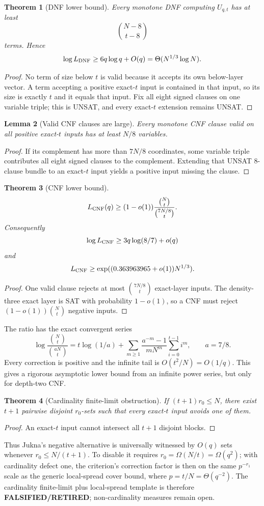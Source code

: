 \documentclass[11pt]{article}
\newtheorem{theorem}{Theorem}
\newtheorem{lemma}[theorem]{Lemma}
\begin{document}
\begin{theorem}[DNF lower bound]
Every monotone DNF computing $U_{q,t}$ has at least
\[
\binom{N-8}{t-8}
\]
terms. Hence
\[
\log L_{\rm DNF}\ge6q\log q+O(q)=\Theta(N^{1/3}\log N).
\]
\end{theorem}
\begin{proof}
No term of size below $t$ is valid because it accepts its own below-layer vector. A term accepting a positive exact-$t$ input is contained in that input, so its size is exactly $t$ and it equals that input. Fix all eight signed clauses on one variable triple; this is UNSAT, and every exact-$t$ extension remains UNSAT.
\end{proof}

\begin{lemma}[Valid CNF clauses are large]
Every monotone CNF clause valid on all positive exact-$t$ inputs has at least $N/8$ variables.
\end{lemma}
\begin{proof}
If its complement has more than $7N/8$ coordinates, some variable triple contributes all eight signed clauses to the complement. Extending that UNSAT 8-clause bundle to an exact-$t$ input yields a positive input missing the clause.
\end{proof}

\begin{theorem}[CNF lower bound]
\[
L_{\rm CNF}(q)\ge(1-o(1))\frac{\binom Nt}{\binom{7N/8}{t}}.
\]
Consequently
\[
\log L_{\rm CNF}\ge3q\log(8/7)+o(q)
\]
and
\[
L_{\rm CNF}\ge\exp((0.363963965+o(1))N^{1/3}).
\]
\end{theorem}
\begin{proof}
One valid clause rejects at most $\binom{7N/8}{t}$ exact-layer inputs. The density-three exact layer is SAT with probability $1-o(1)$, so a CNF must reject $(1-o(1))\binom Nt$ negative inputs.
\end{proof}

The ratio has the exact convergent series
\[
\log\frac{\binom Nt}{\binom{aN}{t}}
=t\log(1/a)+\sum_{m\ge1}\frac{a^{-m}-1}{mN^m}\sum_{i=0}^{t-1}i^m,
\qquad a=7/8.
\]
Every correction is positive and the infinite tail is $O(t^2/N)=O(1/q)$. This gives a rigorous asymptotic lower bound from an infinite power series, but only for depth-two CNF.

\begin{theorem}[Cardinality finite-limit obstruction]
If $(t+1)r_0\le N$, there exist $t+1$ pairwise disjoint $r_0$-sets such that every exact-$t$ input avoids one of them.
\end{theorem}
\begin{proof}
An exact-$t$ input cannot intersect all $t+1$ disjoint blocks.
\end{proof}
Thus Jukna's negative alternative is universally witnessed by $O(q)$ sets whenever $r_0\le N/(t+1)$. To disable it requires $r_0=\Omega(N/t)=\Omega(q^2)$; with cardinality defect one, the criterion's correction factor is then on the same $p^{-r_1}$ scale as the generic local-spread cover bound, where $p=t/N=\Theta(q^{-2})$. The cardinality finite-limit plus local-spread template is therefore \textbf{FALSIFIED/RETIRED}; non-cardinality measures remain open.
\end{document}
